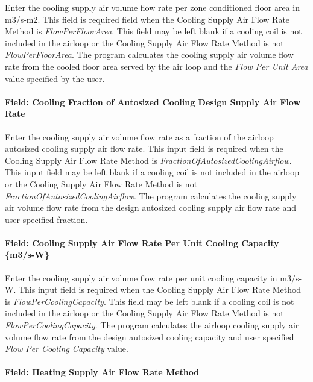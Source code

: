 Enter the cooling supply air volume flow rate per zone conditioned floor area in m3/s-m2. This field is required field when the Cooling Supply Air Flow Rate Method is \emph{FlowPerFloorArea}. This field may be left blank if a cooling coil is not included in the airloop or the Cooling Supply Air Flow Rate Method is not \emph{FlowPerFloorArea}. The program calculates the cooling supply air volume flow rate from the cooled floor area served by the air loop and the \emph{Flow Per Unit Area} value specified by the user.

\paragraph{Field: Cooling Fraction of Autosized Cooling Design Supply Air Flow Rate}\label{field-cooling-fraction-of-autosized-cooling-design-supply-air-flow-rate}

Enter the cooling supply air volume flow rate as a fraction of the airloop autosized cooling supply air flow rate. This input field is required when the Cooling Supply Air Flow Rate Method is \emph{FractionOfAutosizedCoolingAirflow}. This input field may be left blank if a cooling coil is not included in the airloop or the Cooling Supply Air Flow Rate Method is not \emph{FractionOfAutosizedCoolingAirflow}. The program calculates the cooling supply air volume flow rate from the design autosized cooling supply air flow rate and user specified fraction.

\paragraph{Field: Cooling Supply Air Flow Rate Per Unit Cooling Capacity \{m3/s-W\}}\label{field-cooling-supply-air-flow-rate-per-unit-cooling-capacity-m3s-w}

Enter the cooling supply air volume flow rate per unit cooling capacity in m3/s-W. This input field is required when the Cooling Supply Air Flow Rate Method is \emph{FlowPerCoolingCapacity}. This field may be left blank if a cooling coil is not included in the airloop or the Cooling Supply Air Flow Rate Method is not \emph{FlowPerCoolingCapacity}. The program calculates the airloop cooling supply air volume flow rate from the design autosized cooling capacity and user specified \emph{Flow Per Cooling Capacity} value.

\paragraph{Field: Heating Supply Air Flow Rate Method}\label{field-heating-supply-air-flow-rate-method}

